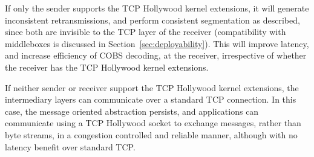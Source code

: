 If only the sender supports the TCP Hollywood kernel extensions, it will
generate inconsistent retransmissions, and perform consistent segmentation
as described, since both are invisible to the TCP layer of the receiver
(compatibility with middleboxes is discussed in Section~\ref{sec:deployability}).
This will improve latency, and increase efficiency of COBS decoding, at
the receiver, irrespective of whether the receiver has the TCP Hollywood
kernel extensions.

If neither sender or receiver support the TCP Hollywood kernel extensions,
the intermediary layers can communicate over a standard TCP connection. In
this case, the message oriented abstraction persists, and applications can
communicate using a TCP Hollywood socket to exchange messages, rather than
byte streams, in a congestion controlled and reliable manner, although
with no latency benefit over standard TCP.
